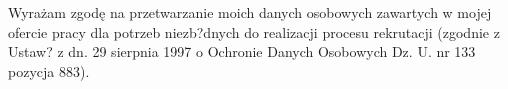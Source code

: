\documentclass[11pt]{moderncv}
\begin{document}
\closesection



\footnotesize
Wyrażam zgodę na przetwarzanie moich danych osobowych zawartych w mojej ofercie pracy dla potrzeb niezb?dnych do realizacji procesu rekrutacji (zgodnie z Ustaw? z dn. 29 sierpnia 1997 o Ochronie Danych Osobowych Dz. U. nr 133 pozycja 883).
\end{document}
